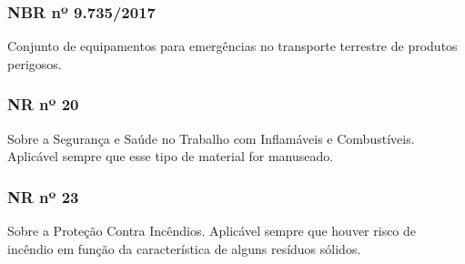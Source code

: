 \begin{subapend}
\begin{subsubapend}
		\subsubsection{NBR nº 9.735/2017}
		Conjunto de equipamentos para emergências no transporte terrestre de produtos perigosos.
	
		\subsubsection{NR nº 20}
		Sobre a Segurança e Saúde no Trabalho com Inflamáveis e Combustíveis. Aplicável sempre que esse tipo de material for manuseado.
	
		\subsubsection{NR nº 23}
		Sobre a Proteção Contra Incêndios. Aplicável sempre que houver risco de incêndio em função da característica de alguns resíduos sólidos.
	\end{subsubapend}
\end{subapend}

